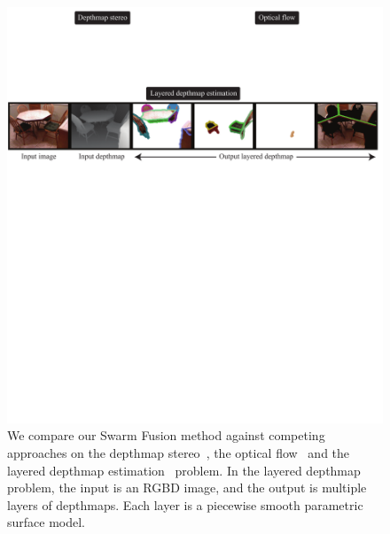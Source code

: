 %
\begin{figure}[tb]
  \includegraphics[width=\columnwidth]{figure/problem.pdf} \caption{We
    compare our Swarm Fusion method against competing approaches on the
    depthmap stereo~\cite{middlebury_stereo}, the optical
    flow~\cite{middlebury_optical_flow} and the layered depthmap
    estimation~\cite{layered_depthmap} problem. In the layered
    depthmap problem, the input is an RGBD image, and the output is
    multiple layers of depthmaps. Each layer is a piecewise smooth
    parametric surface model.}\label{fig:problem}
\end{figure}



